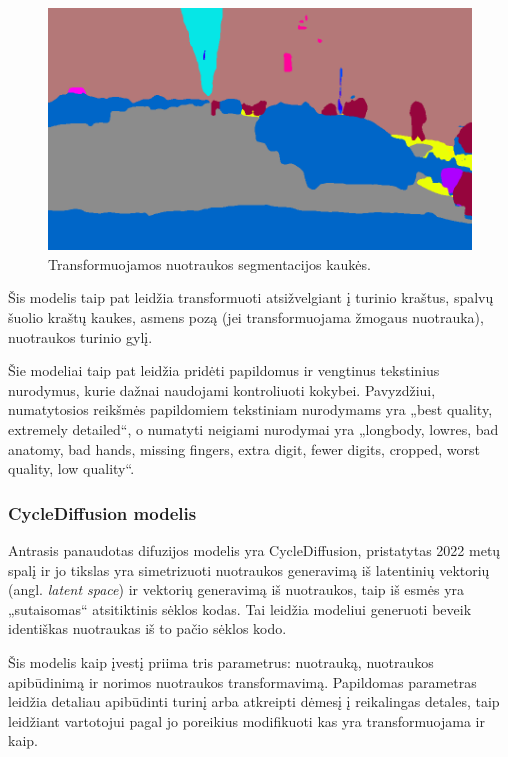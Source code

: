 \documentclass{VUMIFPSbakalaurinis}
\begin{document}
            \begin{figure}[H]
                \centering
                \includegraphics[scale=0.4287]{img/diffusion/controlnet/mask}
                \caption{Transformuojamos nuotraukos segmentacijos kaukės.}
                \label{fig:mask}
            \end{figure}

            Šis modelis taip pat leidžia transformuoti atsižvelgiant į turinio kraštus, spalvų šuolio kraštų kaukes, asmens pozą (jei transformuojama žmogaus nuotrauka), nuotraukos turinio gylį.

            Šie modeliai taip pat leidžia pridėti papildomus ir vengtinus tekstinius nurodymus, kurie dažnai naudojami kontroliuoti kokybei. Pavyzdžiui, numatytosios reikšmės papildomiem tekstiniam nurodymams yra „best quality, extremely detailed“, o numatyti neigiami nurodymai yra „longbody, lowres, bad anatomy, bad hands, missing fingers, extra digit, fewer digits, cropped, worst quality, low quality“.
        \subsubsection{CycleDiffusion modelis}
            Antrasis panaudotas difuzijos modelis yra CycleDiffusion, pristatytas 2022 metų spalį ir jo tikslas yra simetrizuoti nuotraukos generavimą iš latentinių vektorių (angl. \emph{latent space}) ir vektorių generavimą iš nuotraukos, taip iš esmės yra „sutaisomas“ atsitiktinis sėklos kodas. Tai leidžia modeliui generuoti beveik identiškas nuotraukas iš to pačio sėklos kodo.

            Šis modelis kaip įvestį priima tris parametrus: nuotrauką, nuotraukos apibūdinimą ir norimos nuotraukos transformavimą. Papildomas parametras leidžia detaliau apibūdinti turinį arba atkreipti dėmesį į reikalingas detales, taip leidžiant vartotojui pagal jo poreikius modifikuoti kas yra transformuojama ir kaip.
\end{document}
